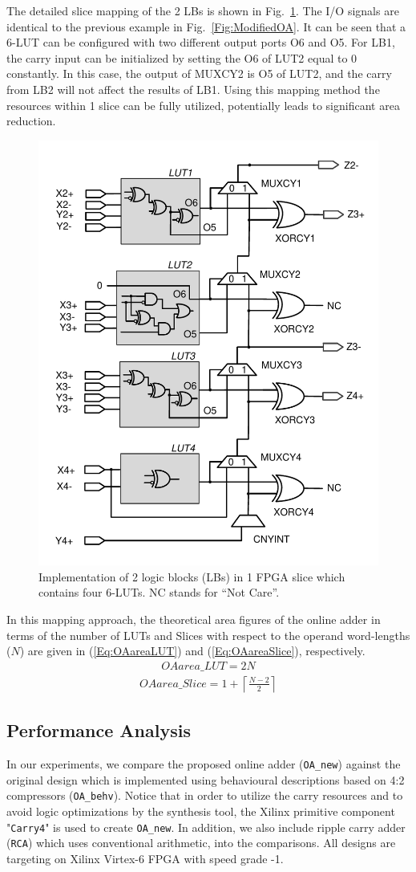 \documentclass[conference]{IEEEtran}
\begin{document}
The detailed slice mapping of the 2 LBs is shown in Fig.~\ref{Fig:SliceNew}. The I/O signals are identical to the previous example in Fig.~\ref{Fig:ModifiedOA}. It can be seen that a 6-LUT can be configured with two different output ports O6 and O5. For LB1, the carry input can be initialized by setting the O6 of LUT2 equal to 0 constantly. In this case, the output of MUXCY2 is O5 of LUT2, and the carry from LB2 will not affect the results of LB1. Using this mapping method the resources within 1 slice can be fully utilized, potentially leads to significant area reduction.

\begin{figure}[tbp]
	\centering
	\includegraphics[width=.5\textwidth]{./Figures/SDadder_FastCarry_New.pdf}
	\caption{Implementation of 2 logic blocks (LBs) in 1 FPGA slice which contains four 6-LUTs. NC stands for ``Not Care''.}
	\label{Fig:SliceNew}
\end{figure}

In this mapping approach, the theoretical area figures of the online adder in terms of the number of LUTs and Slices with respect to the operand word-lengths ($N$) are given in (\ref{Eq:OAareaLUT}) and (\ref{Eq:OAareaSlice}), respectively.
\begin{eqnarray}\label{Eq:OAareaLUT}
	OAarea\_LUT = 2N
\end{eqnarray}
%
\begin{eqnarray}\label{Eq:OAareaSlice}
	OAarea\_Slice = 1+\left\lceil\frac{N-2}{2}\right\rceil
\end{eqnarray}

\subsection{Performance Analysis}
In our experiments, we compare the proposed online adder (\texttt{OA\_new}) against the original design which is implemented using behavioural descriptions based on 4:2 compressors (\texttt{OA\_behv}). Notice that in order to utilize the carry resources and to avoid logic optimizations by the synthesis tool, the Xilinx primitive component "\texttt{Carry4}" is used to create \texttt{OA\_new}. In addition, we also include ripple carry adder (\texttt{RCA}) which uses conventional arithmetic, into the comparisons. All designs are targeting on Xilinx Virtex-6 FPGA with speed grade -1. 
\end{document}
